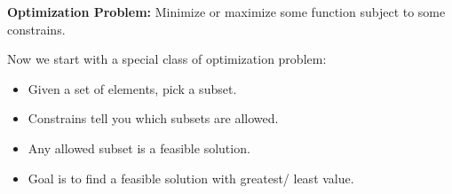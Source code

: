 \begin{definition}
\textbf{Optimization Problem:} Minimize or maximize some function subject to 
some constrains.
\end{definition}



Now we start with a special class of optimization problem:

\begin{itemize}
 \item Given a set of elements, pick a subset.
 \item Constrains tell you which subsets are allowed.
 \item Any allowed subset is a feasible solution.
 \item Goal is to find a feasible solution with greatest/ least value.
\end{itemize}
